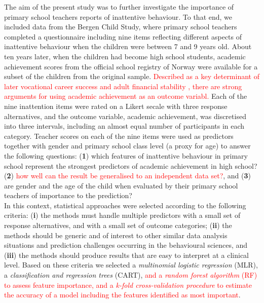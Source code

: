 \documentclass[10pt,letterpaper]{article}
\begin{document}
The aim of the present study was to further investigate the importance of primary school teachers reports of inattentive behaviour. To that end, we included data from the Bergen Child Study, where primary school teachers completed a questionnaire including nine items reflecting different aspects of inattentive behaviour when the children were between 7 and 9 years old. About ten years later, when the children had become high school students, academic achievement scores from the official school registry of Norway were available for a subset of the children from the original sample. \textcolor{red}{Described as a key determinant of later vocational career success and adult
financial stability \cite{Fried2016}, there are strong arguments for using academic achievement as an outcome variabl.} Each of the nine inattention items were rated on a Likert secale with three response alternatives, and the outcome variable, academic achievement, was discretised into three intervals, including an almost equal number of participants in each category.  Teacher scores on each of the nine items were used as predictors together with gender and primary school class level (a proxy for age) to answer the following questions: ({\bf1}) which features of inattentive behaviour in primary school represent the strongest predictors of academic achievement in high school? ({\bf 2}) \textcolor{red}{how well can the result be generalised to an independent data set?}, and ({\bf3}) are gender and the age of the child when evaluated by their primary school teachers of importance to the prediction?  \\ 

In this context, statistical approaches were selected according to the following criteria: ({\bf i}) the methods must handle multiple predictors with a small set of response alternatives, and with a small set of outcome categories; ({\bf ii}) the methods should be generic and of interest to other similar data analysis situations  
and prediction challenges  occurring in the behavioural sciences, and ({\bf iii}) the methods should produce results that are easy to interpret at a clinical level. 
Based on these criteria we selected a {\em multinomial logistic regression} (MLR), a {\em classification and regression trees} (CART), \textcolor{red}{and a {\em random forest algorithm} (RF) to assess feature importance, and a {\em k-fold cross-validation procedure} to estimate the accuracy of a model including the features identified as most important}. 
\end{document}
